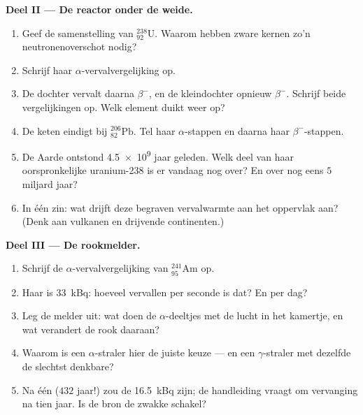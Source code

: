 \begin{problem}
\medskip
\noindent\textbf{Deel II --- De reactor onder de weide.}
\begin{enumerate}[resume]
  \item Geef de samenstelling van ${}^{238}_{92}\mathrm{U}$. Waarom hebben
        zware kernen zo'n neutronenoverschot nodig?
  \item Schrijf haar $\alpha$-vervalvergelijking op.
  \item De dochter vervalt daarna $\beta^-$, en de kleindochter opnieuw
        $\beta^-$. Schrijf beide vergelijkingen op. Welk element duikt
        weer op?
  \item De keten eindigt bij ${}^{206}_{82}\mathrm{Pb}$. Tel haar
        $\alpha$-stappen en daarna haar $\beta^-$-stappen.
  \item De Aarde ontstond \num{4.5e9} jaar geleden. Welk deel van haar
        oorspronkelijke uranium-238 is er vandaag nog over? En over nog
        eens $5$ miljard jaar?
  \item In één zin: wat drijft deze begraven vervalwarmte aan het
        oppervlak aan? (Denk aan vulkanen en drijvende continenten.)
\end{enumerate}

\medskip
\noindent\textbf{Deel III --- De rookmelder.}
\begin{enumerate}[resume]
  \item Schrijf de $\alpha$-vervalvergelijking van
        ${}^{241}_{95}\mathrm{Am}$ op.
  \item Haar  is \qty{33}{kBq}: hoeveel vervallen per seconde
        is dat? En per dag?
  \item Leg de melder uit: wat doen de $\alpha$-deeltjes met de lucht in
        het kamertje, en wat verandert de rook daaraan?
  \item Waarom is een $\alpha$-straler hier de juiste keuze --- en een
        $\gamma$-straler met dezelfde  de slechtst denkbare?
  \item Na één  ($432$ jaar!) zou de 
        \qty{16.5}{kBq} zijn; de handleiding vraagt om vervanging na tien
        jaar. Is de bron de zwakke schakel?
\end{enumerate}


\end{problem}
